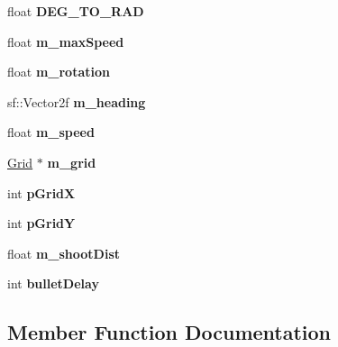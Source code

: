 \begin{DoxyCompactItemize}
\mbox{\label{class_predator_aeb0176a3c6ba8ab3a817c19a529e7e74}} 
float {\bfseries D\+E\+G\+\_\+\+T\+O\+\_\+\+R\+AD}
\item 
\mbox{\label{class_predator_a138b0a60e74c5ee42c4a7eafb33b25ac}} 
float {\bfseries m\+\_\+max\+Speed}
\item 
\mbox{\label{class_predator_a100410c1f5ca7b6c31c83571dab301ac}} 
float {\bfseries m\+\_\+rotation}
\item 
\mbox{\label{class_predator_af9a1e975d30230f63ea2bb73438385a9}} 
sf\+::\+Vector2f {\bfseries m\+\_\+heading}
\item 
\mbox{\label{class_predator_a299d3a779921b4835a6fed06fa090561}} 
float {\bfseries m\+\_\+speed}
\item 
\mbox{\label{class_predator_a4245af2757509639551ceb75b85daa42}} 
\mbox{\hyperlink{class_grid}{Grid}} $\ast$ {\bfseries m\+\_\+grid}
\item 
\mbox{\label{class_predator_afb4342513b5df20b6ff3b6893f2f89e9}} 
int {\bfseries p\+GridX}
\item 
\mbox{\label{class_predator_a904ca89e68b174a5c9396b92ec73eeeb}} 
int {\bfseries p\+GridY}
\item 
\mbox{\label{class_predator_ad2c8e8e6bf5fbe09086f89e778eae80f}} 
float {\bfseries m\+\_\+shoot\+Dist}
\item 
\mbox{\label{class_predator_a92ca5dc5c3354780facc0b768041af12}} 
int {\bfseries bullet\+Delay}
\end{DoxyCompactItemize}


\subsection{Member Function Documentation}
\mbox{\label{class_predator_aefe19fc634893644a2a4244dda82ad9c}} 
